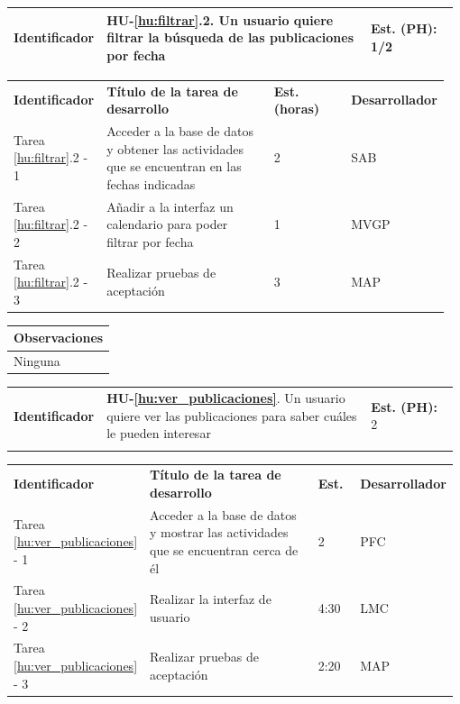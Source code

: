\documentclass[11pt]{article}
\begin{document}
\centering
\begin{longtable}{p{0.18\linewidth}|p{0.6\linewidth}|p{0.2\linewidth}}
	\toprule
	\toprule
	\textbf{Identificador} & \textbf{HU-\ref{hu:filtrar}.2}. Un usuario quiere filtrar la búsqueda de las publicaciones por fecha & \textbf{Est. (PH):} 1/2 \\
	
	\bottomrule
\end{longtable}

\begin{longtable}{p{0.18\linewidth}|p{0.4\linewidth}|p{0.18\linewidth}|p{0.2\linewidth}}
	\toprule
	\textbf{Identificador} & \textbf{Título de la tarea de desarrollo} & \textbf{Est. (horas)} & \textbf{Desarrollador} \\
        Tarea \ref{hu:filtrar}.2 - 1 & Acceder a la base de datos y obtener las actividades que se encuentran en las fechas indicadas & 2 & SAB\\
        Tarea \ref{hu:filtrar}.2 - 2 & Añadir a la interfaz un calendario para poder filtrar por fecha & 1 & MVGP\\
        Tarea \ref{hu:filtrar}.2 - 3 & Realizar pruebas de aceptación & 3 & MAP\\
	\bottomrule
\end{longtable}

\begin{longtable}{p{1.028\linewidth}}
	\textbf{Observaciones}\\
	\midrule
	Ninguna\\
	\bottomrule
	\bottomrule
\end{longtable}

\centering
\begin{longtable}{p{0.18\linewidth}|p{0.6\linewidth}|p{0.2\linewidth}}
	\toprule
	\toprule
	\textbf{Identificador} & \textbf{HU-\ref{hu:ver_publicaciones}}. Un usuario quiere ver las publicaciones para saber cuáles le pueden interesar & \textbf{Est. (PH):} 2\\ \\
	
	\bottomrule
\end{longtable}

\begin{longtable}{p{0.18\linewidth}|p{0.5\linewidth}|p{0.1\linewidth}|p{0.2\linewidth}}
	\toprule
	\textbf{Identificador} & \textbf{Título de la tarea de desarrollo} & \textbf{Est.} & \textbf{Desarrollador} \\
        Tarea \ref{hu:ver_publicaciones} - 1 & Acceder  a la base de datos y mostrar las actividades que se encuentran cerca de él & 2 & PFC\\
        Tarea \ref{hu:ver_publicaciones} - 2 & Realizar la interfaz de usuario & 4:30 & LMC\\
        Tarea \ref{hu:ver_publicaciones} - 3 & Realizar pruebas de aceptación & 2:20 & MAP\\
	\bottomrule
\end{longtable}
\end{document}
